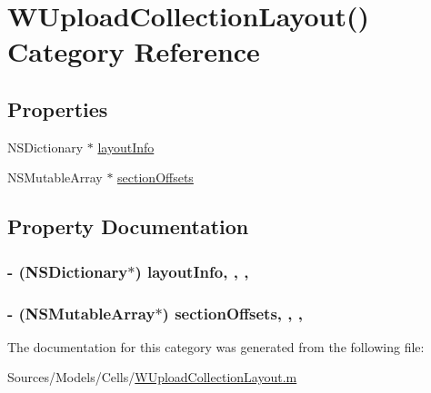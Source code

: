 \hypertarget{category_w_upload_collection_layout_07_08}{\section{W\-Upload\-Collection\-Layout() Category Reference}
\label{category_w_upload_collection_layout_07_08}
}
\subsection*{Properties}
\begin{DoxyCompactItemize}
\item 
N\-S\-Dictionary $\ast$ \hyperlink{category_w_upload_collection_layout_07_08_a5af64473f724872351cc86a203d9dbed}{layout\-Info}
\item 
N\-S\-Mutable\-Array $\ast$ \hyperlink{category_w_upload_collection_layout_07_08_a33cccc0e0aaf4988e1e1e6b4889cd654}{section\-Offsets}
\end{DoxyCompactItemize}


\subsection{Property Documentation}
\hypertarget{category_w_upload_collection_layout_07_08_a5af64473f724872351cc86a203d9dbed}{
\subsubsection[{layout\-Info}]{\setlength{\rightskip}{0pt plus 5cm}-\/ (N\-S\-Dictionary$\ast$) layout\-Info\hspace{0.3cm}{\ttfamily [read]}, {\ttfamily [write]}, {\ttfamily [nonatomic]}, {\ttfamily [strong]}}}\label{category_w_upload_collection_layout_07_08_a5af64473f724872351cc86a203d9dbed}
\hypertarget{category_w_upload_collection_layout_07_08_a33cccc0e0aaf4988e1e1e6b4889cd654}{
\subsubsection[{section\-Offsets}]{\setlength{\rightskip}{0pt plus 5cm}-\/ (N\-S\-Mutable\-Array$\ast$) section\-Offsets\hspace{0.3cm}{\ttfamily [read]}, {\ttfamily [write]}, {\ttfamily [nonatomic]}, {\ttfamily [strong]}}}\label{category_w_upload_collection_layout_07_08_a33cccc0e0aaf4988e1e1e6b4889cd654}


The documentation for this category was generated from the following file\-:\begin{DoxyCompactItemize}
\item 
Sources/\-Models/\-Cells/\hyperlink{_w_upload_collection_layout_8m}{W\-Upload\-Collection\-Layout.\-m}\end{DoxyCompactItemize}
